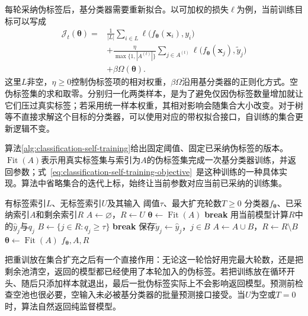 每轮采纳伪标签后，基分类器需要重新拟合。以可加权的损失$\ell$为例，当前训练目标可以写成
\begin{equation}
  \label{eq:classification-self-training-objective}
  \begin{aligned}
    \mathcal{J}_t(\bm{\theta})
      ={}&\frac{1}{|L|}\sum_{i\in L}
        \ell\bigl(f_{\bm{\theta}}(\bm{x}_i),y_i\bigr)\\
      &+\frac{\eta}{\max\{1,|A^{(t)}|\}}
        \sum_{j\in A^{(t)}}
        \ell\bigl(f_{\bm{\theta}}(\bm{x}_j),\widetilde y_j\bigr)\\
      &+\beta\Omega(\bm{\theta}).
  \end{aligned}
\end{equation}
这里$L$非空，$\eta\geq0$控制伪标签项的相对权重，$\beta\Omega$沿用基分类器的正则化方式。空伪标签集的求和取零。分别归一化两类样本，是为了避免仅因伪标签数量增加就让它们压过真实标签；若采用统一样本权重，其相对影响会随集合大小改变。对于树等不直接求解这个目标的分类器，可以使用对应的带权拟合接口，自训练的集合更新逻辑不变。

算法\ref{alg:classification-self-training}给出固定阈值、固定已采纳伪标签的版本。$\operatorname{Fit}(A)$表示用真实标签集与索引为$A$的伪标签集完成一次基分类器训练，并返回参数；式~\eqref{eq:classification-self-training-objective}~是这种训练的一种具体实现。算法中省略集合的迭代上标，始终让当前参数对应当前已采纳的训练集。

\begin{algorithm}[带最终重训的自训练]
  \label{alg:classification-self-training}
  \begin{algorithmic}[1]
    \Require 有标签索引$L$、无标签索引$U$及其输入
    \Require 阈值$\tau$、最大扩充轮数$T\geq0$
    \Ensure 分类器$f_{\bm{\theta}}$、已采纳索引$A$和剩余索引$R$
    \State $A\gets\varnothing$，$R\gets U$
    \State $\bm{\theta}\gets\operatorname{Fit}(A)$
        \State \textbf{break}
      \EndIf
      \State 用当前模型计算$R$中的$\widehat y_j$与$q_j$
      \State $B\gets\{j\in R:q_j\geq\tau\}$
        \State \textbf{break}
      \EndIf
      \State 保存$\widetilde y_j\gets\widehat y_j$，$j\in B$
      \State $A\gets A\cup B$，$R\gets R\setminus B$
      \State $\bm{\theta}\gets\operatorname{Fit}(A)$
    \EndFor
    \State \Return $f_{\bm{\theta}},A,R$
  \end{algorithmic}
\end{algorithm}

把重训放在集合扩充之后有一个直接作用：无论这一轮恰好用完最大轮数，还是把剩余池清空，返回的模型都已经使用了本轮加入的伪标签。若把训练放在循环开头、随后只添加样本就退出，最后一批伪标签实际上不会影响返回模型。预测前检查空池也很必要，空输入未必被基分类器的批量预测接口接受。当$U$为空或$T=0$时，算法自然返回纯监督模型。

